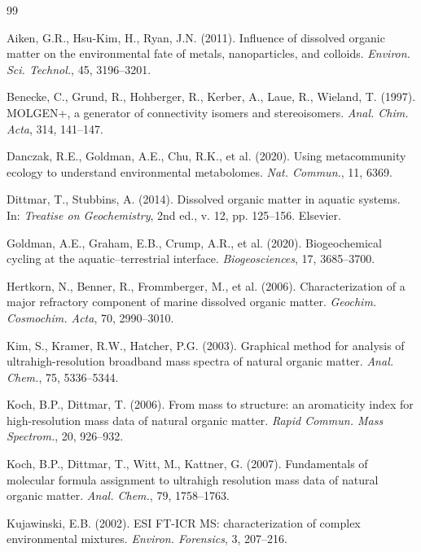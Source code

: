 \documentclass[12pt,letterpaper]{article}
\begin{document}

\begin{thebibliography}{99}

Aiken, G.R., Hsu-Kim, H., Ryan, J.N. (2011).
Influence of dissolved organic matter on the environmental fate of metals, nanoparticles, and colloids.
\textit{Environ. Sci. Technol.}, 45, 3196--3201.

Benecke, C., Grund, R., Hohberger, R., Kerber, A., Laue, R., Wieland, T. (1997).
MOLGEN+, a generator of connectivity isomers and stereoisomers.
\textit{Anal. Chim. Acta}, 314, 141--147.

Danczak, R.E., Goldman, A.E., Chu, R.K., et al. (2020).
Using metacommunity ecology to understand environmental metabolomes.
\textit{Nat. Commun.}, 11, 6369.

Dittmar, T., Stubbins, A. (2014).
Dissolved organic matter in aquatic systems.
In: \textit{Treatise on Geochemistry}, 2nd ed., v. 12, pp. 125--156. Elsevier.

Goldman, A.E., Graham, E.B., Crump, A.R., et al. (2020).
Biogeochemical cycling at the aquatic--terrestrial interface.
\textit{Biogeosciences}, 17, 3685--3700.

Hertkorn, N., Benner, R., Frommberger, M., et al. (2006).
Characterization of a major refractory component of marine dissolved organic matter.
\textit{Geochim. Cosmochim. Acta}, 70, 2990--3010.

Kim, S., Kramer, R.W., Hatcher, P.G. (2003).
Graphical method for analysis of ultrahigh-resolution broadband mass spectra of natural organic matter.
\textit{Anal. Chem.}, 75, 5336--5344.

Koch, B.P., Dittmar, T. (2006).
From mass to structure: an aromaticity index for high-resolution mass data of natural organic matter.
\textit{Rapid Commun. Mass Spectrom.}, 20, 926--932.

Koch, B.P., Dittmar, T., Witt, M., Kattner, G. (2007).
Fundamentals of molecular formula assignment to ultrahigh resolution mass data of natural organic matter.
\textit{Anal. Chem.}, 79, 1758--1763.

Kujawinski, E.B. (2002).
ESI FT-ICR MS: characterization of complex environmental mixtures.
\textit{Environ. Forensics}, 3, 207--216.


\end{thebibliography}
\end{document}
